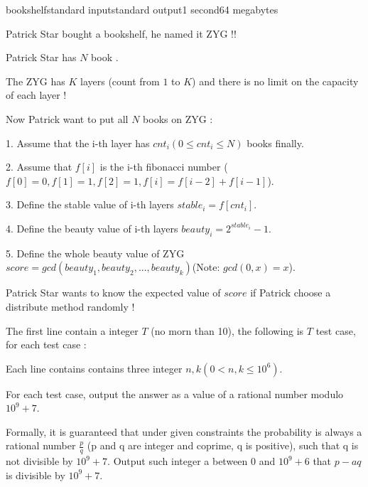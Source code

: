 \begin{problem}{bookshelf}{standard input}{standard output}{1 second}{64 megabytes}

Patrick Star bought a bookshelf, he named it ZYG !! 

Patrick Star has $N$ book .

The ZYG has $K$ layers (count from $1$ to $K$) and there is no limit on the capacity of each layer !

Now Patrick want to put all $N$ books on ZYG :

1. Assume that the i-th layer has $cnt_i(0 \le cnt_i \le N)$ books finally.

2. Assume that $f[i]$ is the i-th fibonacci number ($f[0] = 0, f[1] = 1, f[2] = 1, f[i] = f[i - 2] + f[i - 1]$). 

3. Define the stable value of i-th layers $stable_i = f[cnt_i]$.

4. Define the beauty value of i-th layers $beauty_i = 2^{stable_i} - 1$.

5. Define the whole beauty value of ZYG $score = gcd(beauty_1, beauty_2, ..., beauty_k)$(Note: $gcd(0, x) = x$).

Patrick Star wants to know the expected value of $score$ if Patrick choose a distribute method  randomly !

\InputFile
The first line contain a integer $T$ (no morn than 10), the following is $T$ test case, for each test case :

Each line contains contains three integer $n, k(0 < n, k \le 10^6)$.

\OutputFile
For each test case, output the answer as a value of a rational number modulo $10^9 + 7$.

Formally, it is guaranteed that under given constraints the probability is always a rational number $\frac{p}{q}$ (p and q are integer and coprime, q is positive), such that q is not divisible by $10^9 + 7$. Output such integer a between 0 and $10^9+6$ that $p-aq$ is divisible by $10^9+7$.

\Example

\begin{example}
%
\end{example}

\end{problem}

